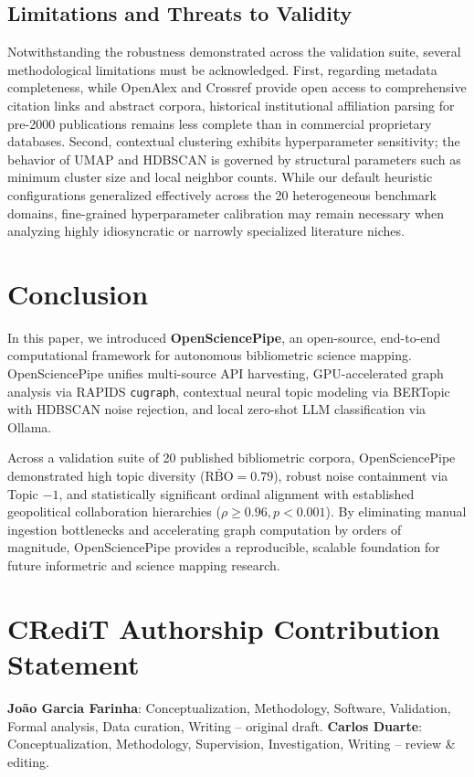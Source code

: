 \documentclass[preprint,12pt]{elsarticle}
\begin{document}
\subsection{Limitations and Threats to Validity}
Notwithstanding the robustness demonstrated across the validation suite, several methodological limitations must be acknowledged. First, regarding metadata completeness, while OpenAlex and Crossref provide open access to comprehensive citation links and abstract corpora, historical institutional affiliation parsing for pre-2000 publications remains less complete than in commercial proprietary databases. Second, contextual clustering exhibits hyperparameter sensitivity; the behavior of UMAP and HDBSCAN is governed by structural parameters such as minimum cluster size and local neighbor counts. While our default heuristic configurations generalized effectively across the 20 heterogeneous benchmark domains, fine-grained hyperparameter calibration may remain necessary when analyzing highly idiosyncratic or narrowly specialized literature niches.

\section{Conclusion}
\label{sec:conclusion}
In this paper, we introduced \textbf{OpenSciencePipe}, an open-source, end-to-end computational framework for autonomous bibliometric science mapping. OpenSciencePipe unifies multi-source API harvesting, GPU-accelerated graph analysis via RAPIDS \texttt{cugraph}, contextual neural topic modeling via BERTopic with HDBSCAN noise rejection, and local zero-shot LLM classification via Ollama. 

Across a validation suite of 20 published bibliometric corpora, OpenSciencePipe demonstrated high topic diversity ($\bar{\text{RBO}} = 0.79$), robust noise containment via Topic $-1$, and statistically significant ordinal alignment with established geopolitical collaboration hierarchies ($\rho \ge 0.96, p < 0.001$). By eliminating manual ingestion bottlenecks and accelerating graph computation by orders of magnitude, OpenSciencePipe provides a reproducible, scalable foundation for future informetric and science mapping research.

\section*{CRediT Authorship Contribution Statement}
\textbf{João Garcia Farinha}: Conceptualization, Methodology, Software, Validation, Formal analysis, Data curation, Writing -- original draft. \textbf{Carlos Duarte}: Conceptualization, Methodology, Supervision, Investigation, Writing -- review \& editing.
\end{document}

